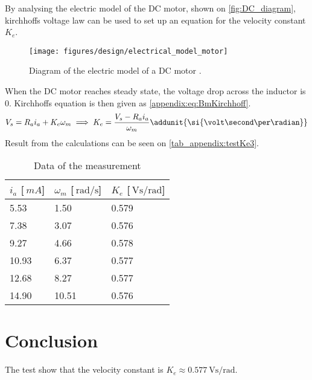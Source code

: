 By analysing the electric model of the DC motor, shown on \autoref{fig:DC_diagram}, kirchhoffs voltage law can be used to set up an equation for the velocity constant $K_e$.
\begin{figure} [h!]
\centering
\texttt{[image: figures/design/electrical\_model\_motor]}
\caption{Diagram of the electric model of a DC motor \citep{ModelingAndAnalisys}.}
\label{fig:DC_diagram}
\end{figure} 

When the DC motor reaches steady state, the voltage drop across the inductor is 0. Kirchhoffs equation is then given as \autoref{appendix:eq:BmKirchhoff}.
\begin{equation}
V_s= R_a  i_a + K_e  \omega_m \implies K_e = \frac{V_s - R_a i_a}{\omega_m} \addunit{\si{\volt\second\per\radian}} \label{appendix:eq:BmKirchhoff}
\end{equation}
Result from the calculations can be seen on \autoref{tab_appendix:testKe3}.

\begin{table}[!h]
	\centering
	\caption{Data of the measurement}\label{tab_appendix:testKe3}
	\begin{tabularx}{\textwidth}{XXX}
		$i_a$ [$\SI{}{mA}$]& $\omega_m$ [$\SI{}{\radian\per\second}$]	& $K_e$ [$\SI{}{\volt\second\per\radian}$]									\\ \toprule \rowcolor{lightGrey}
		5.53 & 1.50 & 0.579	\\
		7.38 & 3.07 & 0.576 \\ \rowcolor{lightGrey}
		9.27 & 4.66 & 0.578 \\
		10.93 & 6.37 & 0.577 \\ \rowcolor{lightGrey}
		12.68 & 8.27 & 0.577 \\
		14.90 & 10.51 & 0.576 \\ 
	\end{tabularx}
\end{table}

\newpage
\section*{Conclusion}
The test show that the velocity constant is $K_e\approx\SI{0.577}{\volt\second\per\radian}$.